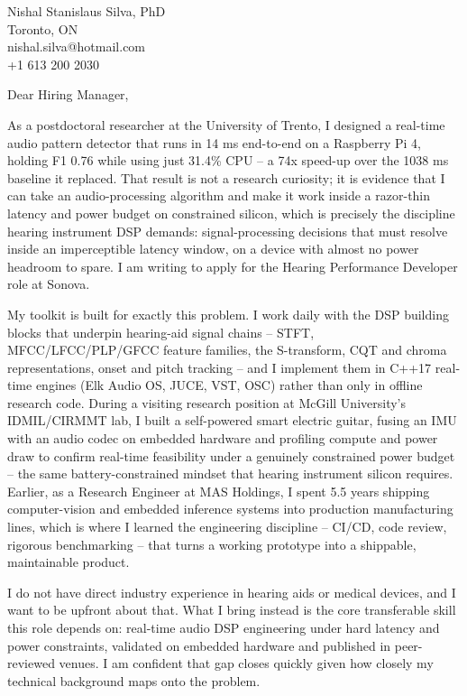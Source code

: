 \documentclass[11pt]{article}
\begin{document}
\pagestyle{empty}

\begin{flushright}
Nishal Stanislaus Silva, PhD \\
Toronto, ON \\
nishal.silva@hotmail.com \\
+1 613 200 2030
\end{flushright}

\noindent Dear Hiring Manager,

\vspace{0.5em}
\noindent As a postdoctoral researcher at the University of Trento, I designed a real-time audio pattern detector that runs in 14 ms end-to-end on a Raspberry Pi 4, holding F1 0.76 while using just 31.4\% CPU -- a 74x speed-up over the 1038 ms baseline it replaced. That result is not a research curiosity; it is evidence that I can take an audio-processing algorithm and make it work inside a razor-thin latency and power budget on constrained silicon, which is precisely the discipline hearing instrument DSP demands: signal-processing decisions that must resolve inside an imperceptible latency window, on a device with almost no power headroom to spare. I am writing to apply for the Hearing Performance Developer role at Sonova.

\vspace{0.5em}
\noindent My toolkit is built for exactly this problem. I work daily with the DSP building blocks that underpin hearing-aid signal chains -- STFT, MFCC/LFCC/PLP/GFCC feature families, the S-transform, CQT and chroma representations, onset and pitch tracking -- and I implement them in C++17 real-time engines (Elk Audio OS, JUCE, VST, OSC) rather than only in offline research code. During a visiting research position at McGill University's IDMIL/CIRMMT lab, I built a self-powered smart electric guitar, fusing an IMU with an audio codec on embedded hardware and profiling compute and power draw to confirm real-time feasibility under a genuinely constrained power budget -- the same battery-constrained mindset that hearing instrument silicon requires. Earlier, as a Research Engineer at MAS Holdings, I spent 5.5 years shipping computer-vision and embedded inference systems into production manufacturing lines, which is where I learned the engineering discipline -- CI/CD, code review, rigorous benchmarking -- that turns a working prototype into a shippable, maintainable product.

\vspace{0.5em}
\noindent I do not have direct industry experience in hearing aids or medical devices, and I want to be upfront about that. What I bring instead is the core transferable skill this role depends on: real-time audio DSP engineering under hard latency and power constraints, validated on embedded hardware and published in peer-reviewed venues. I am confident that gap closes quickly given how closely my technical background maps onto the problem.
\end{document}
